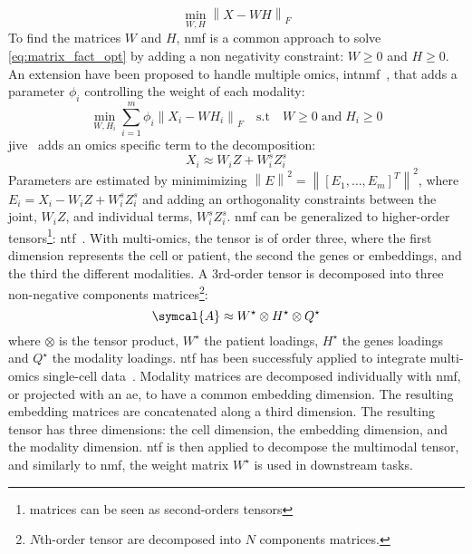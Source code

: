 \documentclass[../main.tex]{subfiles}
\begin{document}
	\begin{equation}
		\min_{W,H} {\left\| X - WH \right\|}_{F} \label{eq:matrix_fact_opt}
	\end{equation}%
	To find the matrices \(W\) and \(H\), \gls{nmf} is a common approach to solve \cref{eq:matrix_fact_opt} by adding a non negativity constraint: \(W \geq 0\) and \(H \geq 0\).
	An extension have been proposed to handle multiple omics, \gls{intnmf}~\cite{Chalise2017}, that adds a parameter \(\phi_{i}\) controlling the weight of each modality:
	\begin{equation}
		\min_{W,H_i} \sum_{i=1}^{m} \phi_{i}{\left\| X_i - WH_i \right\|}_{F} \quad \text{s.t} \quad W \geq 0 \;\text{and}\; H_i \geq 0
	\end{equation}
	\Gls{jive}~\cite{Lock2013} adds an omics specific term to the decomposition:
	\begin{equation}
		X_i \approx W_i Z + W_i^s Z_i^s
	\end{equation}
	Parameters are estimated by minimimizing \({\left\|E\right\|}^2 = {\left\|{\left[E_1, \ldots, E_m \right]}^T\right\|}^2\), where \(E_i = X_i - W_i Z + W_i^s Z_i^s\) and adding an orthogonality constraints between the joint, \(W_i Z\), and individual terms, \( W_i^s Z_i^s\).
	\Gls{nmf} can be generalized to higher-order tensors\footnote{matrices can be seen as second-orders tensors}: \gls{ntf}~\cite{Cichocki2009}.
	With multi-omics, the tensor is of order three, where the first dimension represents the cell or patient, the second the genes or embeddings, and the third the different modalities.
	A 3rd-order tensor is decomposed into three non-negative components matrices\footnote{\(N\)th-order tensor are decomposed into \(N\) components matrices.}:
	\begin{equation}
		\symcal{A} \approx W^{\star}\otimes H^{\star} \otimes Q^{\star}
	\end{equation}
	where \(\otimes\) is the tensor product, \(W^{\star}\) the patient loadings, \(H^{\star}\) the genes loadings and \(Q^{\star}\) the modality loadings.
	\Gls{ntf} has been successfuly applied to integrate multi-omics single-cell data~\cite{Fogel2024}.
	Modality matrices are decomposed individually with \gls{nmf}, or projected with an \gls{ae}, to have a common embedding dimension.
	The resulting embedding matrices are concatenated along a third dimension.
	The resulting tensor has three dimensions: the cell dimension, the embedding dimension, and the modality dimension.
	\Gls{ntf} is then applied to decompose the multimodal tensor, and similarly to \gls{nmf}, the weight matrix \(W^{\star}\) is used in downstream tasks.
\end{document}
